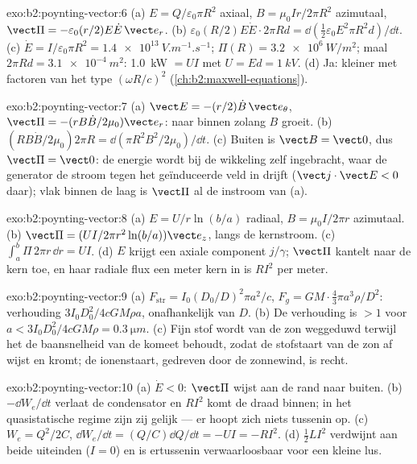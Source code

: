 \begin{solution}{exo:b2:poynting-vector:6}
(a) $E = Q/\varepsilon_0\pi R^2$ axiaal, $B = \mu_0Ir/2\pi R^2$ azimutaal,
$\vect\Pi = -\varepsilon_0
(r/2)E\dot E\,\vect e_r$. (b)
$\varepsilon_0(R/2)E\dot E\cdot2\pi Rd = \dd(\tfrac12\varepsilon_0E^2\pi R^2d)/
\dd t$.
(c) $\dot E = I/\varepsilon_0\pi R^2 = \qty{1.4e13}{V.m^{-1}.s^{-1}}$;
$\Pi(R) = \qty{3.2e6}{W/m^2}$; maal $2\pi Rd = \qty{3.1e-4}{m^2}$:
\qty{1.0}{kW} $= UI$ met $U = Ed = \qty{1}{kV}$. (d) Ja: kleiner met
factoren van het type $(\omega R/c)^2$ (\cref{ch:b2:maxwell-equations}).
\end{solution}

\begin{solution}{exo:b2:poynting-vector:7}
(a) $\vect E = -(r/2)\dot B\,\vect e_\theta$,
$\vect\Pi = -(rB\dot B/2\mu_0)\vect e_r$: naar binnen zolang $B$ groeit. (b)
$(RB\dot B/2\mu_0)2\pi R = \dd(\pi R^2B^2/2\mu_0)/\dd t$. (c) Buiten is
$\vect B = \vect 0$, dus $\vect\Pi = \vect 0$: de energie wordt bij de
wikkeling zelf ingebracht, waar de generator de stroom tegen het
geïnduceerde veld in drijft ($\vect j\cdot\vect E < 0$ daar); vlak binnen de
laag is $\vect\Pi$ al de instroom van (a).
\end{solution}

\begin{solution}{exo:b2:poynting-vector:8}
(a) $E = U/r\ln(b/a)$ radiaal, $B = \mu_0I/2\pi r$ azimutaal. (b)
$\vect\Pi = (UI/
2\pi r^2\ln(b/a))\vect e_z$, langs de kernstroom. (c)
$\int_a^b\Pi\,2\pi r\,\dd r =
UI$. (d) $E$ krijgt een axiale component
$j/\gamma$; $\vect\Pi$ kantelt naar de kern toe, en haar radiale flux een
meter kern in is $RI^2$ per meter.
\end{solution}

\begin{solution}{exo:b2:poynting-vector:9}
(a) $F_{\text{str}} = I_0(D_0/D)^2\pi a^2/c$,
$F_g = GM\cdot\tfrac43\pi a^3\rho/D^2$: verhouding $3I_0D_0^2/4cGM\rho a$,
onafhankelijk van $D$. (b) De verhouding is $> 1$ voor
$a < 3I_0D_0^2/
4cGM\rho = \qty{0.3}{\micro m}$. (c) Fijn stof wordt van de
zon weggeduwd terwijl het de baansnelheid van de komeet behoudt, zodat de
stofstaart van de zon af wijst en kromt; de ionenstaart, gedreven door de
zonnewind, is recht.
\end{solution}

\begin{solution}{exo:b2:poynting-vector:10}
(a) $\dot E < 0$: $\vect\Pi$ wijst aan de rand naar buiten. (b)
$-\dd W_e/\dd t$ verlaat de condensator en $RI^2$ komt de draad binnen; in
het quasistatische regime zijn zij gelijk --- er hoopt zich niets tussenin
op. (c) $W_e =
Q^2/2C$, $\dd W_e/\dd t = (Q/C)\dd Q/\dd t = -UI = -RI^2$.
(d) $\tfrac12LI^2$ verdwijnt aan beide uiteinden ($I = 0$) en is ertussenin
verwaarloosbaar voor een kleine lus.
\end{solution}

